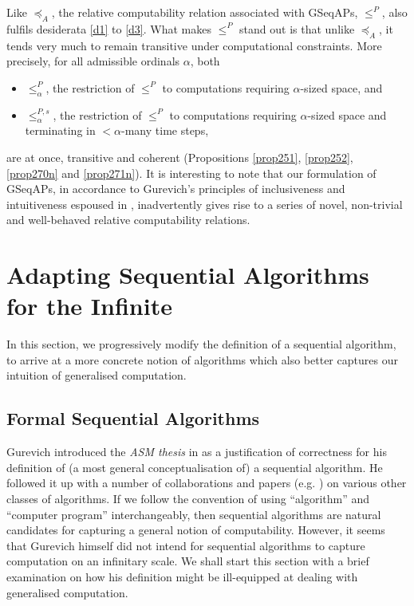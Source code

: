 \documentclass[12pt]{article}
\numberwithin{equation}{section}
\begin{document}
Like $\preceq_A$, the relative computability relation associated with GSeqAPs, $\leq^P$, also fulfils desiderata \ref{d1} to \ref{d3}. What makes $\leq^P$ stand out is that unlike $\preceq_A$, it tends very much to remain transitive under computational constraints. More precisely, for all admissible ordinals $\alpha$, both
\begin{itemize}
    \item $\leq^P_{\alpha}$, the restriction of $\leq^P$ to computations requiring $\alpha$-sized space, and
    \item $\leq^{P, s}_{\alpha}$, the restriction of $\leq^P$ to computations requiring $\alpha$-sized space and terminating in $< \alpha$-many time steps,
\end{itemize}
are at once, transitive and coherent (Propositions \ref{prop251}, \ref{prop252}, \ref{prop270n} and \ref{prop271n}). It is interesting to note that our formulation of GSeqAPs, in accordance to Gurevich's principles of inclusiveness and intuitiveness espoused in \cite{gurevich}, inadvertently gives rise to a series of novel, non-trivial and well-behaved relative computability relations. 

\section{Adapting Sequential Algorithms for the Infinite}\label{sect2}

In this section, we progressively modify the definition of a sequential algorithm, to arrive at a more concrete notion of algorithms which also better captures our intuition of generalised computation. 

\subsection{Formal Sequential Algorithms}\label{ss210}

Gurevich introduced the \textit{ASM thesis} in \cite{gurevich} as a justification of correctness for his definition of (a most general conceptualisation of) a sequential algorithm. He followed it up with a number of collaborations and papers (e.g. \cite{gurevichblass}) on various other classes of algorithms. If we follow the convention of using ``algorithm'' and ``computer program'' interchangeably, then sequential algorithms are natural candidates for capturing a general notion of computability. However, it seems that Gurevich himself did not intend for sequential algorithms to capture computation on an infinitary scale. We shall start this section with a brief examination on how his definition might be ill-equipped at dealing with generalised computation. 
\end{document}
